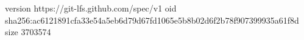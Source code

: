 version https://git-lfs.github.com/spec/v1
oid sha256:ac6121891cfa33e54a5eb6d79d67fd1065e5b8b02d6f2b78f907399935a61f8d
size 3703574
